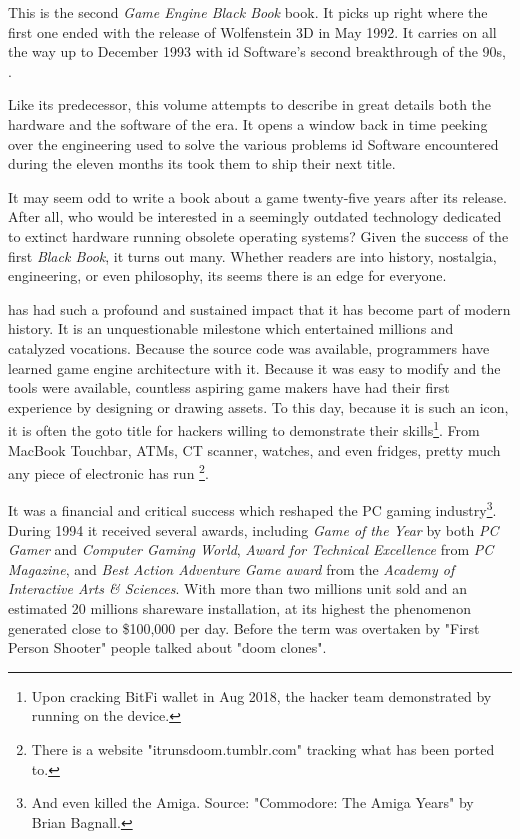 This is the second \textit{Game Engine Black Book} book. It picks up right where the first one ended with the release of Wolfenstein 3D in May 1992. It carries on all the way up to December 1993 with id Software's second breakthrough of the 90s, \doom{}.\\ %
\par
 Like its predecessor, this volume attempts to describe in great details both the hardware and the software of the era. It opens a window back in time peeking over the engineering used to solve the various problems id Software encountered during the eleven months its took them to ship their next title.\\%
\par
It may seem odd to write a book about a game twenty-five years after its release. After all, who would be interested in a seemingly outdated technology dedicated to extinct hardware running obsolete operating systems? Given the success of the first \textit{Black Book}, it turns out many. Whether readers are into history, nostalgia, engineering, or even philosophy, its seems there is an edge for everyone.\\ 

\par
\doom{} has had such a profound and sustained impact that it has become part of modern history. It is an unquestionable milestone which entertained millions and catalyzed vocations. Because the source code was available, programmers have learned game engine architecture with it. Because it was easy to modify and the tools were available, countless aspiring game makers have had their first experience by designing or drawing assets. To this day, because it is such an icon, it is often the goto title for hackers willing to demonstrate their skills\footnote{Upon cracking BitFi wallet in Aug 2018, the hacker team demonstrated by running \doom{} on the device.}. From MacBook Touchbar, ATMs, CT scanner, watches, and even fridges, pretty much any piece of electronic has run \doom{} \footnote{There is a website "itrunsdoom{}.tumblr.com" tracking what \doom{} has been ported to.}.\\
\par

It was a financial and critical success which reshaped the PC gaming industry\footnote{And even killed the Amiga. Source: "Commodore: The Amiga Years" by Brian Bagnall.}. During 1994 it received several awards, including \textit{Game of the Year} by both \textit{PC Gamer} and \textit{Computer Gaming World}, \textit{Award for Technical Excellence} from \textit{PC Magazine}, and \textit{Best Action Adventure Game award} from the \textit{Academy of Interactive Arts \& Sciences}. With more than two millions unit sold and an estimated 20 millions shareware installation, at its highest the phenomenon generated close to \$100,000 per day. Before the term was overtaken by "First Person Shooter" people talked about "doom clones".\\
\par

